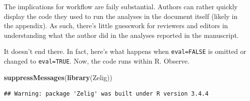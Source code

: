 \documentclass[11pt,]{article}
\newenvironment{Shaded}{\begin{snugshade}}{\end{snugshade}}
\newcommand{\DataTypeTok}[1]{\textcolor[rgb]{0.13,0.29,0.53}{#1}}
\newcommand{\KeywordTok}[1]{\textcolor[rgb]{0.13,0.29,0.53}{\textbf{#1}}}
\newcommand{\NormalTok}[1]{#1}
\newcommand{\OperatorTok}[1]{\textcolor[rgb]{0.81,0.36,0.00}{\textbf{#1}}}
\newcommand{\StringTok}[1]{\textcolor[rgb]{0.31,0.60,0.02}{#1}}
\begin{document}
\begin{Shaded}
\end{Shaded}

The implications for workflow are faily substantial. Authors can rather
quickly display the code they used to run the analyses in the document
itself (likely in the appendix). As such, there's little guesswork for
reviewers and editors in understanding what the author did in the
analyses reported in the manuscript.

It doesn't end there. In fact, here's what happens when
\texttt{eval=FALSE} is omitted or changed to \texttt{eval=TRUE}. Now,
the code runs within R. Observe.

\begin{Shaded}
\begin{Highlighting}[]
\KeywordTok{suppressMessages}\NormalTok{(}\KeywordTok{library}\NormalTok{(Zelig))}
\end{Highlighting}
\end{Shaded}

\begin{verbatim}
## Warning: package 'Zelig' was built under R version 3.4.4
\end{verbatim}
\end{document}
